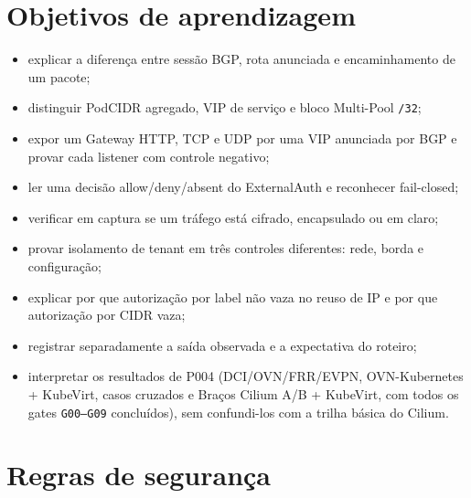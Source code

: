 \documentclass[12pt,openany,oneside,a4paper,chapter=TITLE,english,brazil]{abntex2}
\providecommand{\tightlist}{\setlength{\itemsep}{0pt}\setlength{\parskip}{0pt}}
\begin{document}
\section*{Objetivos de aprendizagem}\label{objetivos-de-aprendizagem}

\begin{itemize}
\tightlist
\item
  explicar a diferença entre sessão BGP, rota anunciada e encaminhamento de um pacote;
\item
  distinguir PodCIDR agregado, VIP de serviço e bloco Multi-Pool \texttt{/\allowbreak{}32};
\item
  expor um Gateway HTTP, TCP e UDP por uma VIP anunciada por BGP e provar cada listener com controle negativo;
\item
  ler uma decisão allow/deny/absent do ExternalAuth e reconhecer fail-closed;
\item
  verificar em captura se um tráfego está cifrado, encapsulado ou em claro;
\item
  provar isolamento de tenant em três controles diferentes: rede, borda e configuração;
\item
  explicar por que autorização por label não vaza no reuso de IP e por que autorização por CIDR vaza;
\item
  registrar separadamente a saída observada e a expectativa do roteiro;
\item
  interpretar os resultados de P004 (DCI/OVN/FRR/EVPN, OVN-Kubernetes + KubeVirt, casos cruzados e Braços Cilium A/B + KubeVirt, com todos os gates \texttt{G00–G09} concluídos), sem confundi-los com a trilha básica do Cilium.
\end{itemize}

\section*{Regras de segurança}\label{regras-de-seguranuxe7a}
\end{document}
